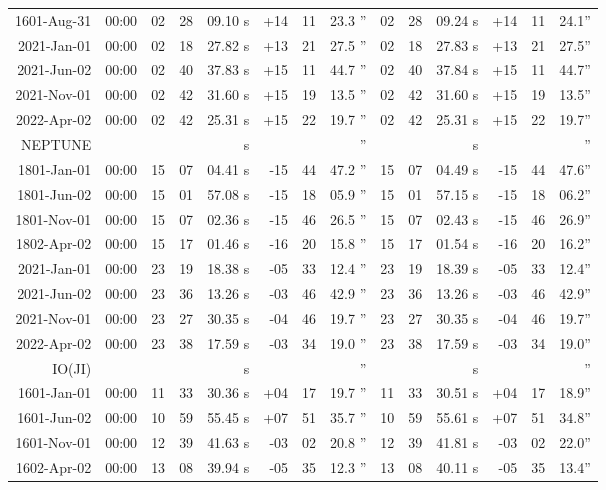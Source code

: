 \begin{longtable}{r@{\,}r|r@{h}r@{m}r<{s}|r@{°}r@{'}r<{''}||r@{h}r@{m}r<{s}|r@{°}r@{'}r<{''}}
 1601-Aug-31 & 00:00  &   02 & 28 & 09.10 & +14 & 11 & 23.3 & 02&28&09.24 & +14&11&24.1\\ %
 2021-Jan-01 & 00:00  &   02 & 18 & 27.82 & +13 & 21 & 27.5 & 02&18&27.83 & +13&21&27.5\\ %
 2021-Jun-02 & 00:00  &   02 & 40 & 37.83 & +15 & 11 & 44.7 & 02&40&37.84 & +15&11&44.7\\ %
 2021-Nov-01 & 00:00  &   02 & 42 & 31.60 & +15 & 19 & 13.5 & 02&42&31.60 & +15&19&13.5\\ %
 2022-Apr-02 & 00:00  &   02 & 42 & 25.31 & +15 & 22 & 19.7 & 02&42&25.31 & +15&22&19.7\\ %
NEPTUNE     \\
 1801-Jan-01 & 00:00  &   15 & 07 & 04.41 & -15 & 44 & 47.2 & 15&07&04.49 & -15&44&47.6\\ %
 1801-Jun-02 & 00:00  &   15 & 01 & 57.08 & -15 & 18 & 05.9 & 15&01&57.15 & -15&18&06.2\\ %
 1801-Nov-01 & 00:00  &   15 & 07 & 02.36 & -15 & 46 & 26.5 & 15&07&02.43 & -15&46&26.9\\ %
 1802-Apr-02 & 00:00  &   15 & 17 & 01.46 & -16 & 20 & 15.8 & 15&17&01.54 & -16&20&16.2\\ %
 2021-Jan-01 & 00:00  &   23 & 19 & 18.38 & -05 & 33 & 12.4 & 23&19&18.39 & -05&33&12.4\\ %
 2021-Jun-02 & 00:00  &   23 & 36 & 13.26 & -03 & 46 & 42.9 & 23&36&13.26 & -03&46&42.9\\ %
 2021-Nov-01 & 00:00  &   23 & 27 & 30.35 & -04 & 46 & 19.7 & 23&27&30.35 & -04&46&19.7\\ %
 2022-Apr-02 & 00:00  &   23 & 38 & 17.59 & -03 & 34 & 19.0 & 23&38&17.59 & -03&34&19.0\\ %
IO(JI)    \\
 1601-Jan-01 & 00:00  &   11 & 33 & 30.36 & +04 & 17 & 19.7 & 11&33&30.51 & +04&17&18.9\\ %
 1601-Jun-02 & 00:00  &   10 & 59 & 55.45 & +07 & 51 & 35.7 & 10&59&55.61 & +07&51&34.8\\ %
 1601-Nov-01 & 00:00  &   12 & 39 & 41.63 & -03 & 02 & 20.8 & 12&39&41.81 & -03&02&22.0\\ %
 1602-Apr-02 & 00:00  &   13 & 08 & 39.94 & -05 & 35 & 12.3 & 13&08&40.11 & -05&35&13.4\\ %

\end{longtable}
